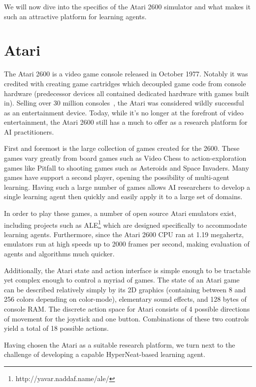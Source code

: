 \documentclass{acm_proc_article-sp}
\begin{document}
We will now dive into the specifics of the Atari 2600 simulator and what makes it such an attractive platform for learning agents.

\section{Atari}
\label{sec:atari}
The Atari 2600 is a video game console released in October 1977. Notably it was credited with creating game cartridges which decoupled game code from console hardware (predecessor devices all contained dedicated hardware with games built in). Selling over 30 million consoles~\cite{atarihist}, the Atari was considered wildly successful as an entertainment device. Today, while it's no longer at the forefront of video entertainment, the Atari 2600 still has a much to offer as a research platform for AI practitioners. 

First and foremost is the large collection of games created for the 2600. These games vary greatly from board games such as Video Chess to action-exploration games like Pitfall to shooting games such as Asteroids and Space Invaders. Many games have support a second player, opening the possibility of multi-agent learning. Having such a large number of games allows AI researchers to develop a single learning agent then quickly and easily apply it to a large set of domains.

In order to play these games, a number of open source Atari emulators exist, including projects such as ALE\footnote{http://yavar.naddaf.name/ale/} which are designed specifically to accommodate learning agents. Furthermore, since the Atari 2600 CPU ran at 1.19 megahertz, emulators run at high speeds up to 2000 frames per second, making evaluation of agents and algorithms much quicker.

Additionally, the Atari state and action interface is simple enough to be tractable yet complex enough to control a myriad of games. The state of an Atari game can be described relatively simply by its 2D graphics (containing between 8 and 256 colors depending on color-mode), elementary sound effects, and 128 bytes of console RAM. The discrete action space for Atari consists of 4 possible directions of movement for the joystick and one button. Combinations of these two controls yield a total of 18 possible actions.

Having chosen the Atari as a suitable research platform, we turn next to the challenge of developing a capable HyperNeat-based learning agent.
\end{document}
